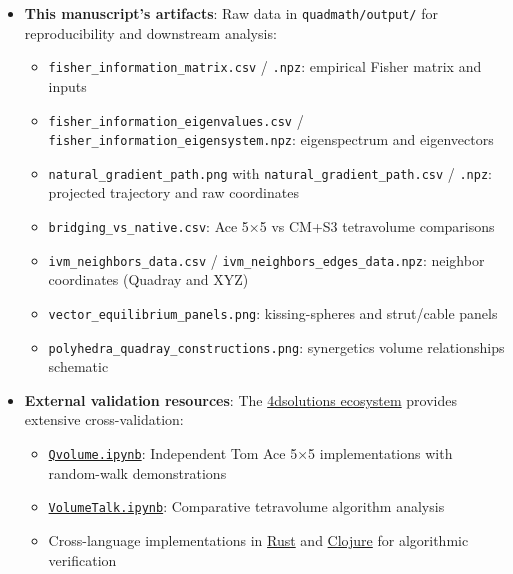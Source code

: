 \documentclass[
  10pt,
]{article}
\providecommand{\tightlist}{%
  \setlength{\itemsep}{0pt}\setlength{\parskip}{0pt}}
\begin{document}
\begin{itemize}
\tightlist
\item
  \textbf{This manuscript's artifacts}: Raw data in
  \texttt{quadmath/output/} for reproducibility and downstream analysis:

  \begin{itemize}
  \tightlist
  \item
    \texttt{fisher\_information\_matrix.csv} / \texttt{.npz}: empirical
    Fisher matrix and inputs
  \item
    \texttt{fisher\_information\_eigenvalues.csv} /
    \texttt{fisher\_information\_eigensystem.npz}: eigenspectrum and
    eigenvectors
  \item
    \texttt{natural\_gradient\_path.png} with
    \texttt{natural\_gradient\_path.csv} / \texttt{.npz}: projected
    trajectory and raw coordinates
  \item
    \texttt{bridging\_vs\_native.csv}: Ace 5×5 vs CM+S3 tetravolume
    comparisons
  \item
    \texttt{ivm\_neighbors\_data.csv} /
    \texttt{ivm\_neighbors\_edges\_data.npz}: neighbor coordinates
    (Quadray and XYZ)
  \item
    \texttt{vector\_equilibrium\_panels.png}: kissing-spheres and
    strut/cable panels
  \item
    \texttt{polyhedra\_quadray\_constructions.png}: synergetics volume
    relationships schematic
  \end{itemize}
\item
  \textbf{External validation resources}: The
  \href{https://github.com/4dsolutions}{4dsolutions ecosystem} provides
  extensive cross-validation:

  \begin{itemize}
  \tightlist
  \item
    \href{https://github.com/4dsolutions/School_of_Tomorrow/blob/master/Qvolume.ipynb}{\texttt{Qvolume.ipynb}}:
    Independent Tom Ace 5×5 implementations with random-walk
    demonstrations
  \item
    \href{https://github.com/4dsolutions/School_of_Tomorrow/blob/master/VolumeTalk.ipynb}{\texttt{VolumeTalk.ipynb}}:
    Comparative tetravolume algorithm analysis
  \item
    Cross-language implementations in
    \href{https://github.com/4dsolutions/rusty_rays}{Rust} and
    \href{https://github.com/4dsolutions/synmods}{Clojure} for
    algorithmic verification
  \end{itemize}
\end{itemize}
\end{document}

